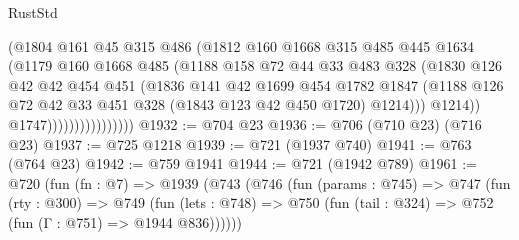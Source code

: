 \begin{lexlean}{RustStd}
\begin{coremodule}
                                (@1804
                                  @161
                                  @45
                                  @315
                                  @486
                                  (@1812
                                    @160
                                    @1668
                                    @315
                                    @485
                                    @445
                                    @1634
                                    (@1179
                                      @160
                                      @1668
                                      @485
                                      (@1188
                                        @158
                                        @72
                                        @44
                                        @33
                                        @483
                                        @328
                                        (@1830
                                          @126
                                          @42
                                          @42
                                          @454
                                          @451
                                          (@1836
                                            @141
                                            @42
                                            @1699
                                            @454
                                            @1782
                                            @1847
                                            (@1188
                                              @126
                                              @72
                                              @42
                                              @33
                                              @451
                                              @328
                                              (@1843 @123 @42 @450 @1720)
                                              @1214)))
                                        @1214))
                                    @1747))))))))))))))))
@1932 := @704 @23
@1936 := @706 (@710 @23) (@716 @23)
@1937 := @725 @1218
@1939 := @721 (@1937 @740)
@1941 := @763 (@764 @23)
@1942 := @759 @1941
@1944 := @721 (@1942 @789)
@1961 := @720
    (fun (fn : @7) =>
    @1939
      (@743
        (@746
          (fun (params : @745) =>
          @747
            (fun (rty : @300) =>
            @749
              (fun (lets : @748) =>
              @750 (fun (tail : @324) => @752 (fun (Γ : @751) => @1944 @836))))))

\end{coremodule}
\end{lexlean}
